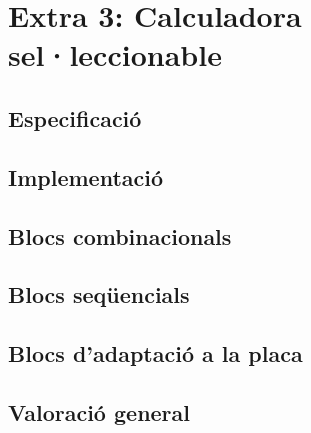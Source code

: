 \chapter{Extra 3: Calculadora sel·leccionable}

\section{Especificació}

\section{Implementació}


\section{Blocs combinacionals}

\section{Blocs seqüencials}

\section{Blocs d'adaptació a la placa}

\section{Valoració general}



